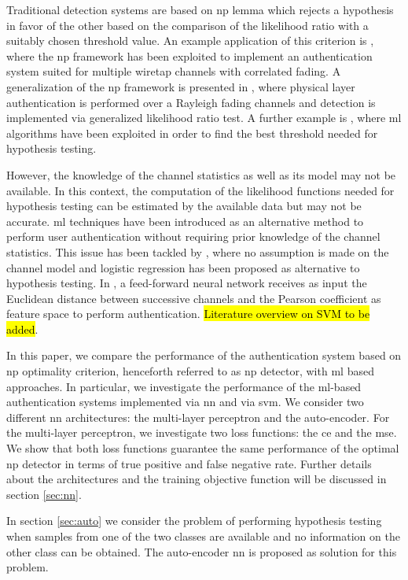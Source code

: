 \documentclass[draftcls,onecolumn,12pt]{IEEEtran}
\begin{document}
Traditional detection systems are based on \ac{np} lemma which rejects a hypothesis in favor of the other based on the comparison of the likelihood ratio with a suitably chosen threshold value. An example application of this criterion is \cite{Baracca-12}, where the \ac{np} framework has been exploited to implement an authentication system suited for multiple wiretap channels with correlated fading. A generalization of the \ac{np} framework is presented in \cite{Xiao-09}, where physical layer authentication is performed over a Rayleigh fading channels and detection is implemented via generalized likelihood ratio test. A further example is \cite{Pan-17}, where \ac{ml} algorithms have been exploited in order to find the best threshold needed for hypothesis testing.

However, the knowledge of the channel statistics as well as its model may not be available. In this context, the computation of the likelihood functions needed for hypothesis testing can be estimated by the available data but may not be accurate. \ac{ml} techniques have been introduced as an alternative method to perform user authentication without requiring prior knowledge of the channel statistics. This issue has been tackled by \cite{xiao-2018}, where no assumption is made on the channel model and logistic regression has been proposed as alternative to hypothesis testing. In \cite{Wang-17}, a feed-forward neural network receives as input the Euclidean distance between successive channels and the Pearson coefficient as feature space to perform authentication. 
%
 \hl{Literature overview on SVM to be added}.

In this paper, we compare the performance of the authentication system based on \ac{np} optimality criterion, henceforth referred to as \ac{np} detector, with \ac{ml} based approaches. In particular, we investigate the performance of the \ac{ml}-based authentication systems implemented via \ac{nn} and via \ac{svm}. We consider two different \ac{nn} architectures: the multi-layer perceptron and the auto-encoder. For the multi-layer perceptron, we investigate two loss functions: the \ac{ce} and the \ac{mse}. We show that both loss functions guarantee the same performance of the optimal \ac{np} detector in terms of true positive and false negative rate. Further details about the architectures and the training objective function will be discussed in section \ref{sec:nn}.

In section \ref{sec:auto} we consider the problem of performing hypothesis testing when samples from one of the two classes are available and no information on the other class can be obtained. The auto-encoder \ac{nn} is proposed as solution for this problem.
\end{document}
